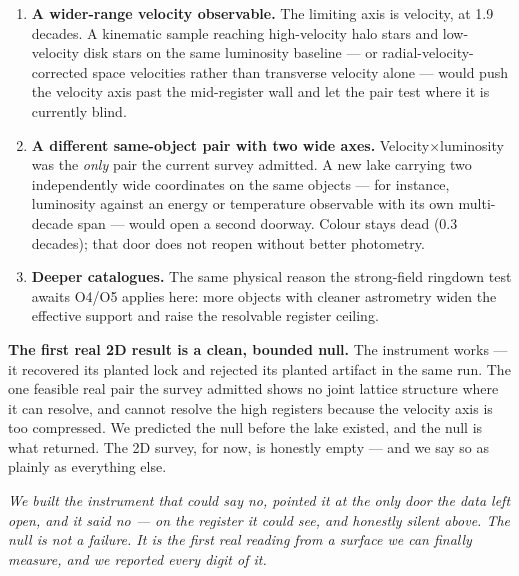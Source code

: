 \documentclass[11pt, letterpaper, openany]{book}
\begin{document}
\begin{enumerate}
\item \textbf{A wider-range velocity observable.} The limiting axis is velocity, at 1.9 decades.
A kinematic sample reaching high-velocity halo stars and low-velocity disk stars on the same
luminosity baseline --- or radial-velocity-corrected space velocities rather than transverse
velocity alone --- would push the velocity axis past the mid-register wall and let the pair test
where it is currently blind.
\item \textbf{A different same-object pair with two wide axes.} Velocity$\times$luminosity was the
\emph{only} pair the current survey admitted. A new lake carrying two independently wide
coordinates on the same objects --- for instance, luminosity against an energy or temperature
observable with its own multi-decade span --- would open a second doorway. Colour stays dead
(0.3 decades); that door does not reopen without better photometry.
\item \textbf{Deeper catalogues.} The same physical reason the strong-field ringdown test awaits
O4/O5 applies here: more objects with cleaner astrometry widen the effective support and raise the
resolvable register ceiling.
\end{enumerate}

\begin{nullbox}
\textbf{The first real 2D result is a clean, bounded null.} The instrument works --- it recovered
its planted lock and rejected its planted artifact in the same run. The one feasible real pair the
survey admitted shows no joint lattice structure where it can resolve, and cannot resolve the high
registers because the velocity axis is too compressed. We predicted the null before the lake
existed, and the null is what returned. The 2D survey, for now, is honestly empty --- and we say
so as plainly as everything else.
\end{nullbox}

\begin{center}
\vspace{0.5em}
\itshape
We built the instrument that could say no, pointed it at the only door the data left open, and it
said no --- on the register it could see, and honestly silent above. The null is not a failure. It
is the first real reading from a surface we can finally measure, and we reported every digit of it.
\vspace{0.5em}
\end{center}


\end{document}
